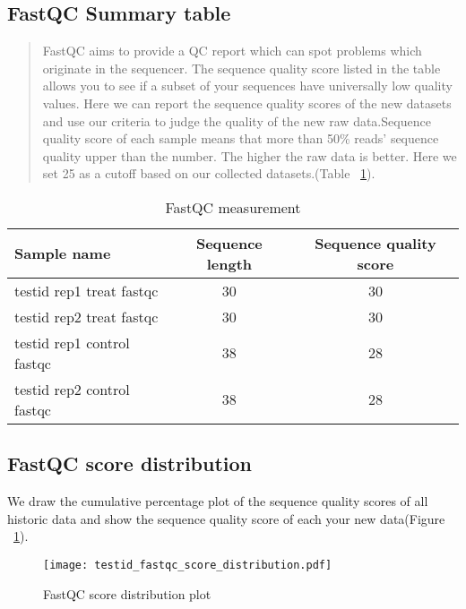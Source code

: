 \documentclass[11pt,a4paper]{article}
\begin{document}
\subsection{FastQC Summary table}
\begin{quotation}
FastQC aims to provide a QC report which can spot problems which originate in the sequencer. 
The sequence quality score listed in the table allows you to see if a subset of your sequences have universally low quality values. Here we can report the sequence quality scores of the new datasets and use our criteria to judge the quality of the new raw data.Sequence quality score of each sample means that more than 50\% reads' sequence quality upper than the number. The higher the raw data is better. Here we set 25 as a cutoff based on our collected datasets.(Table ~\ref{fastqctable}).\\
\end{quotation}
\begin{table}[h]
\caption{FastQC measurement}\label{fastqctable}
\begin{tabularx}{\textwidth}{ |X|c|c| } 
\hline
Sample name & Sequence length & Sequence quality score \\
\hline
testid rep1 treat fastqc & 30 & 30 \\
\hline
testid rep2 treat fastqc & 30 & 30 \\
\hline
testid rep1 control fastqc & 38 & 28 \\
\hline
testid rep2 control fastqc & 38 & 28 \\
\hline
\end{tabularx}
\end{table}
\newpage	

\subsection{FastQC score distribution}
We draw the cumulative percentage plot of the sequence quality scores of all historic data and show the sequence quality score of each your new data(Figure ~\ref{fastqcplot}). \newline
\begin{figure}[h]
\setlength{\abovecaptionskip}{0pt} 
\setlength{\belowcaptionskip}{10pt}
\caption{FastQC score distribution plot} \label{fastqcplot}
\centering
{\texttt{[image: testid\_fastqc\_score\_distribution.pdf]}}
\end{figure}
\newpage	
\end{document}
